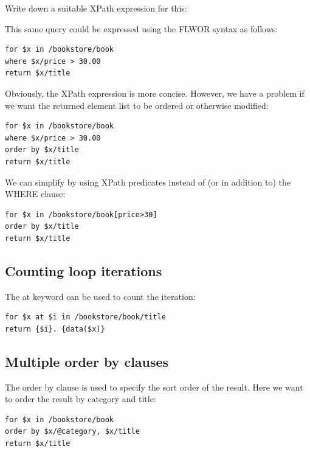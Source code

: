 \documentclass{pgnotes}
\begin{document}
Write down a suitable XPath expression for this: 

\vspace{\fill}

This same query could be expressed using the FLWOR syntax as follows:

\begin{verbatim}
for $x in /bookstore/book
where $x/price > 30.00
return $x/title
\end{verbatim}

Obviously, the XPath expression is more concise. 
However, we have a problem if we want the returned element list to be ordered or otherwise modified:

\begin{verbatim}
for $x in /bookstore/book
where $x/price > 30.00
order by $x/title
return $x/title
\end{verbatim}

We can simplify by using XPath predicates instead of (or in addition to) the WHERE clause: 

\begin{verbatim}
for $x in /bookstore/book[price>30]
order by $x/title
return $x/title
\end{verbatim}

\subsection{Counting loop iterations}

The at keyword can be used to count the iteration:

\begin{verbatim}
for $x at $i in /bookstore/book/title
return {$i}. {data($x)}
\end{verbatim}

\subsection{Multiple order by clauses}

The order by clause is used to specify the sort order of the result. Here we want to order the result by category and title:

\begin{verbatim}
for $x in /bookstore/book
order by $x/@category, $x/title
return $x/title
\end{verbatim}



\end{document}

